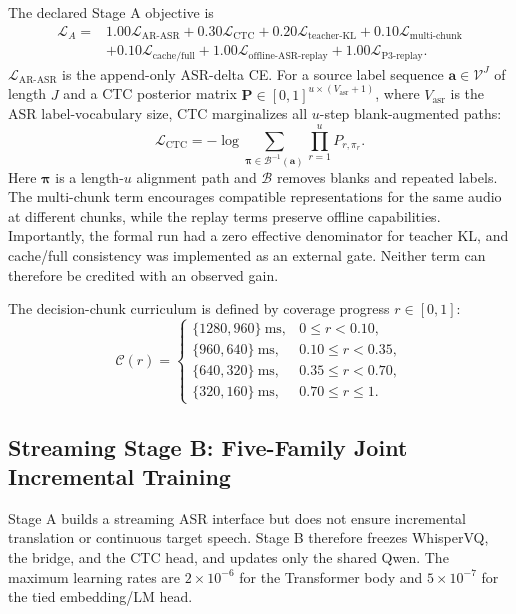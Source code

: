 \documentclass[11pt,a4paper]{article}
\newcommand{\vect}[1]{\bm{#1}}
\newcommand{\mat}[1]{\bm{#1}}
\newcommand{\Vocab}{\mathcal{V}}
\newcommand{\Loss}{\mathcal{L}}
\begin{document}
The declared Stage A objective is
\begin{align}
 \Loss_A={}&1.00\Loss_{\mathrm{AR\text{-}ASR}}
 +0.30\Loss_{\mathrm{CTC}}
 +0.20\Loss_{\mathrm{teacher\text{-}KL}}
 +0.10\Loss_{\mathrm{multi\text{-}chunk}}\nonumber\\
 &+0.10\Loss_{\mathrm{cache/full}}
 +1.00\Loss_{\mathrm{offline\text{-}ASR\text{-}replay}}
 +1.00\Loss_{\mathrm{P3\text{-}replay}}.
 \label{eq:stagea}
\end{align}
$\Loss_{\mathrm{AR\text{-}ASR}}$ is the append-only ASR-delta CE. For a source label sequence $\vect{a}\in\Vocab^J$ of length $J$ and a CTC posterior matrix $\mat{P}\in[0,1]^{u\times(V_{\mathrm{asr}}+1)}$, where $V_{\mathrm{asr}}$ is the ASR label-vocabulary size, CTC marginalizes all $u$-step blank-augmented paths:
\begin{equation}
 \Loss_{\mathrm{CTC}}=-\log\sum_{\vect{\pi}\in\mathcal{B}^{-1}(\vect{a})}
 \prod_{r=1}^{u}P_{r,\pi_r}.
 \label{eq:ctc}
\end{equation}
Here $\vect{\pi}$ is a length-$u$ alignment path and $\mathcal{B}$ removes blanks and repeated labels. The multi-chunk term encourages compatible representations for the same audio at different chunks, while the replay terms preserve offline capabilities. Importantly, the formal run had a zero effective denominator for teacher KL, and cache/full consistency was implemented as an external gate. Neither term can therefore be credited with an observed gain.

The decision-chunk curriculum is defined by coverage progress $r\in[0,1]$:
\begin{equation}
 \mathcal{C}(r)=
 \begin{cases}
 \{1280,960\}\ \mathrm{ms}, & 0\le r<0.10,\\
 \{960,640\}\ \mathrm{ms}, & 0.10\le r<0.35,\\
 \{640,320\}\ \mathrm{ms}, & 0.35\le r<0.70,\\
 \{320,160\}\ \mathrm{ms}, & 0.70\le r\le1.
 \end{cases}
 \label{eq:chunkcurr}
\end{equation}

\subsection{Streaming Stage B: Five-Family Joint Incremental Training}

Stage A builds a streaming ASR interface but does not ensure incremental translation or continuous target speech. Stage B therefore freezes WhisperVQ, the bridge, and the CTC head, and updates only the shared Qwen. The maximum learning rates are $2\times10^{-6}$ for the Transformer body and $5\times10^{-7}$ for the tied embedding/LM head.
\end{document}
